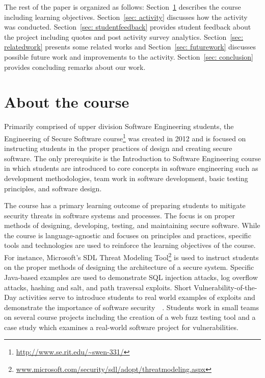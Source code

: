 \documentclass[conference]{IEEEtran}
\begin{document}
The rest of the paper is organized as follows: Section~\ref{sec: aboutcourse} describes the course including learning objectives. Section~\ref{sec: activity} discusses how the activity was conducted. Section~\ref{sec: studentfeedback} provides student feedback about the project including quotes and post activity survey analytics. Section~\ref{sec: relatedwork} presents some related works and Section~\ref{sec: futurework} discusses possible future work and improvements to the activity. Section~\ref{sec: conclusion} provides concluding remarks about our work. 



\section{About the course}
\label{sec: aboutcourse}

Primarily comprised of upper division Software Engineering students, the Engineering of Secure Software
course\footnote{\url{http://www.se.rit.edu/~swen-331/}} was created in 2012 and is focused on instructing students in the proper practices of design and creating secure software. The only prerequisite is the Introduction to Software Engineering course in which students are introduced to core concepts in software engineering such as development methodologies, team work in software development, basic testing principles, and software design.

The course has a primary learning outcome of preparing students to mitigate security threats in software systems and processes. The focus is on proper methods of designing, developing, testing, and maintaining secure software. While the course is language-agnostic and focuses on principles and practices, specific tools and technologies are used to reinforce the learning objectives of the course. For instance, Microsoft's SDL Threat Modeling Tool\footnote{\url{www.microsoft.com/security/sdl/adopt/threatmodeling.aspx}} is used to instruct students on the proper methods of designing the architecture of a secure system. Specific Java-based examples are used to demonstrate SQL injection attacks, log overflow attacks, hashing and salt, and path traversal exploits. Short Vulnerability-of-the-Day activities serve to introduce students to real world examples of exploits and demonstrate the importance of software security~\ \cite{MeneelyICSESEE2013}. Students work in small teams on several course projects including the creation of a web fuzz testing tool and a case study which examines a real-world software project for vulnerabilities.
\end{document}
